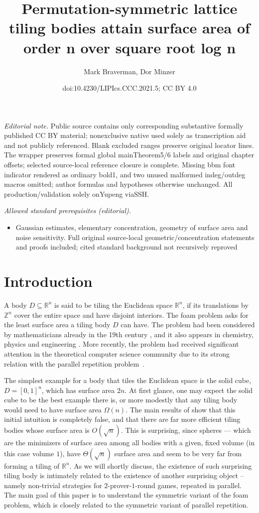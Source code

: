 \documentclass[10pt,a4paper]{article}
\title{Permutation-symmetric lattice tiling bodies attain surface area of order n over square root log n}
\author{Mark Braverman, Dor Minzer}
\date{doi:10.4230/LIPIcs.CCC.2021.5; CC BY 4.0}
\begin{document}
\maketitle
\noindent\textit{Editorial note.} Public source contains only corresponding substantive formally published CC BY material; nonexclusive native used solely as transcription aid and not publicly referenced. Blank excluded ranges preserve original locator lines. The wrapper preserves formal global mainTheorem5/6 labels and original chapter offsets; selected source-local reference closure is complete. Missing bbm font indicator rendered as ordinary bold1, and two unused malformed indeg/outdeg macros omitted; author formulas and hypotheses otherwise unchanged. All production/validation solely onYupeng viaSSH.\par\medskip
\noindent\textit{Allowed standard prerequisites (editorial).}\begin{itemize}
\item Gaussian estimates, elementary concentration, geometry of surface area and noise sensitivity. Full original source-local geometric/concentration statements and proofs included; cited standard background not recursively reproved
\end{itemize}\medskip
\section{Introduction}

A body $D\subseteq\mathbb{R}^n$ is said to be tiling the Euclidean space $\mathbb{R}^n$, if its translations by $\mathbb{Z}^n$
cover the entire space and have disjoint interiors. The foam problem asks for the least surface area a tiling body
$D$ can have. The problem had been considered by mathematicians already in the 19th century \cite{Thomson87},
and it also appears in chemistry, physics and engineering \cite{chemistry}. More recently, the problem had received
significant attention in the theoretical computer science community due to its strong relation with the parallel repetition problem~\cite{FKO,KROW,AK}.

The simplest example for a body that tiles the Euclidean space is the solid cube, $D = [0,1]^n$, which has surface
area $2n$. At first glance, one may expect the solid cube to be the best example there is, or more modestly
that any tiling body would need to have surface area $\Omega(n)$. The main results of \cite{KROW,AK}
show that this initial intuition is completely false, and that there are far more efficient tiling bodies whose surface area is $O(\sqrt{n})$.
This is surprising, since spheres --- which are the minimizers of surface area among all bodies with a given, fixed volume
(in this case volume $1$), have $\Theta(\sqrt{n})$ surface area and seem to be very far from forming a tiling of $\mathbb{R}^n$.
As we will shortly discuss, the existence of such surprising tiling body is intimately related to the existence of another
surprising object -- namely non-trivial strategies for $2$-prover-$1$-round games, repeated in parallel. The main goal of this
paper is to understand the symmetric variant of the foam problem, which is closely related to the symmetric variant of
parallel repetition.
\end{document}
